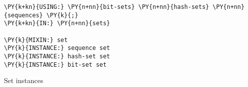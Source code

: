 \centering

\begin{Verbatim}[commandchars=\\\{\},frame=single]
\PY{k+kn}{USING:} \PY{n+nn}{bit-sets} \PY{n+nn}{hash-sets} \PY{n+nn}{sequences} \PY{k}{;}
\PY{k+kn}{IN:} \PY{n+nn}{sets}

\PY{k}{MIXIN:} set
\PY{k}{INSTANCE:} sequence set
\PY{k}{INSTANCE:} hash-set set
\PY{k}{INSTANCE:} bit-set set
\end{Verbatim}

\caption{Set instances}
